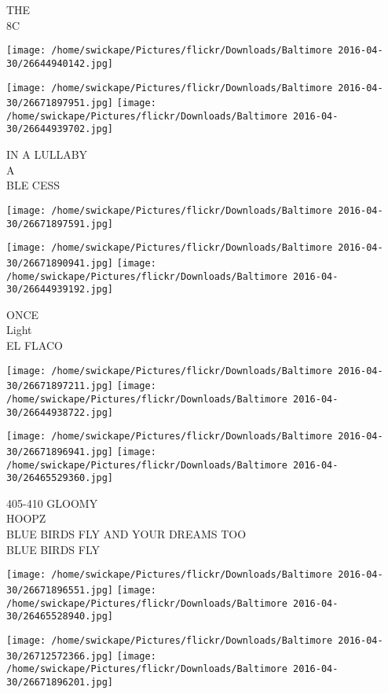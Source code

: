 \documentclass[10pt,letterpaper]{article}
\begin{document}
THE\\
8C
\pagebreak

\texttt{[image: /home/swickape/Pictures/flickr/Downloads/Baltimore 2016-04-30/26644940142.jpg]}

\vspace{0.25in}
\texttt{[image: /home/swickape/Pictures/flickr/Downloads/Baltimore 2016-04-30/26671897951.jpg]}
\texttt{[image: /home/swickape/Pictures/flickr/Downloads/Baltimore 2016-04-30/26644939702.jpg]}

IN A LULLABY\\
A\\
BLE CESS
\pagebreak

\texttt{[image: /home/swickape/Pictures/flickr/Downloads/Baltimore 2016-04-30/26671897591.jpg]}

\vspace{0.25in}
\texttt{[image: /home/swickape/Pictures/flickr/Downloads/Baltimore 2016-04-30/26671890941.jpg]}
\texttt{[image: /home/swickape/Pictures/flickr/Downloads/Baltimore 2016-04-30/26644939192.jpg]}

ONCE\\
Light\\
EL FLACO
\pagebreak

\texttt{[image: /home/swickape/Pictures/flickr/Downloads/Baltimore 2016-04-30/26671897211.jpg]}
\texttt{[image: /home/swickape/Pictures/flickr/Downloads/Baltimore 2016-04-30/26644938722.jpg]}

\texttt{[image: /home/swickape/Pictures/flickr/Downloads/Baltimore 2016-04-30/26671896941.jpg]}
\texttt{[image: /home/swickape/Pictures/flickr/Downloads/Baltimore 2016-04-30/26465529360.jpg]}

405{-}410 GLOOMY\\
HOOPZ\\
BLUE BIRDS FLY AND YOUR DREAMS TOO\\
BLUE BIRDS FLY
\pagebreak

\texttt{[image: /home/swickape/Pictures/flickr/Downloads/Baltimore 2016-04-30/26671896551.jpg]}
\texttt{[image: /home/swickape/Pictures/flickr/Downloads/Baltimore 2016-04-30/26465528940.jpg]}

\texttt{[image: /home/swickape/Pictures/flickr/Downloads/Baltimore 2016-04-30/26712572366.jpg]}
\texttt{[image: /home/swickape/Pictures/flickr/Downloads/Baltimore 2016-04-30/26671896201.jpg]}
\end{document}
